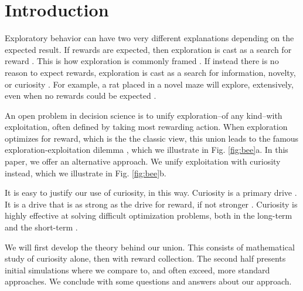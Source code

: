 \section*{Introduction}
Exploratory behavior can have two very different explanations depending on the expected result. If rewards are expected, then exploration is cast as a search for reward \cite{Gupta2006,Sutton2018,Woodgate2017,Lee2011a,Schulz2018a,Calhoun2014}. This is how exploration is commonly framed \cite{Sutton2018}. If instead there is no reason to expect rewards, exploration is cast as a search for information, novelty, or curiosity \cite{Berlyne1950,Schmidhuber1991,Kidd2015,Jaegle2019,Sumner2019,Wang2019,Auersperg2015}. For example, a rat placed in a novel maze will explore, extensively, even when no rewards could be expected \cite{Rosenberg2021}.

An open problem in decision science is to unify exploration--of any kind--with exploitation, often defined by taking most rewarding action. When exploration optimizes for reward, which is the the classic view, this union leads to the famous exploration-exploitation dilemma \cite{Kelly1956,Berger-Tal2014,Dayan1996,Thrun1992,Mehlhorn2015,Kobayashi2019}, which we illustrate in Fig. \ref{fig:bee}a. In this paper, we offer an alternative approach. We unify exploitation with curiosity instead, which we illustrate in Fig. \ref{fig:bee}b.  

It is easy to justify our use of curiosity, in this way. Curiosity is a primary drive \cite{Berlyne1950,Loewenstein1994,Inglis2001}. It is a drive that is as strong as the drive for reward, if not stronger \cite{Loewenstein1994,Kidd2015,Gottlieb2018,Sumner2019,Gopnik2020,Song2019,Wang2019}. Curiosity is highly effective at solving difficult optimization problems, both in the long-term and the short-term \cite{Schmidhuber1991,Pathak2017,Stanton2018,Fister2019,Mouret2015,Colas2020,Cully2015,Pathak2017,Schwartenbeck2019,Laversanne-Finot2018}. 

We will first develop the theory behind our union. This consists of mathematical study of curiosity alone, then with reward collection. The second half presents initial simulations where we compare to, and often exceed, more standard approaches. We conclude with some questions and answers about our approach.


